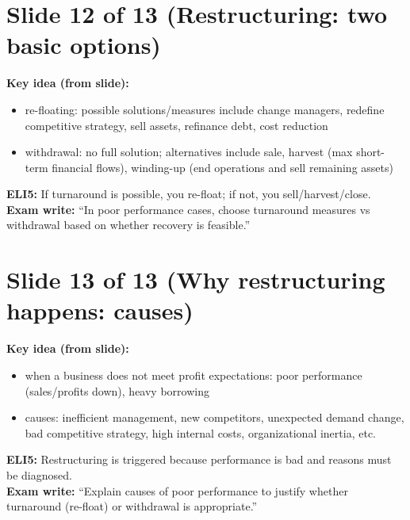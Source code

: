 \documentclass[11pt,a4paper]{article}
\begin{document}
\section*{Slide 12 of 13 (Restructuring: two basic options)}
\textbf{Key idea (from slide):}
\begin{itemize}
  \item re-floating: possible solutions/measures include change managers, redefine competitive strategy, sell assets, refinance debt, cost reduction
  \item withdrawal: no full solution; alternatives include sale, harvest (max short-term financial flows), winding-up (end operations and sell remaining assets)
\end{itemize}
\textbf{ELI5:} If turnaround is possible, you re-float; if not, you sell/harvest/close.\\
\textbf{Exam write:} ``In poor performance cases, choose turnaround measures vs withdrawal based on whether recovery is feasible.''

\section*{Slide 13 of 13 (Why restructuring happens: causes)}
\textbf{Key idea (from slide):}
\begin{itemize}
  \item when a business does not meet profit expectations: poor performance (sales/profits down), heavy borrowing
  \item causes: inefficient management, new competitors, unexpected demand change, bad competitive strategy, high internal costs, organizational inertia, etc.
\end{itemize}
\textbf{ELI5:} Restructuring is triggered because performance is bad and reasons must be diagnosed.\\
\textbf{Exam write:} ``Explain causes of poor performance to justify whether turnaround (re-float) or withdrawal is appropriate.''
\end{document}
